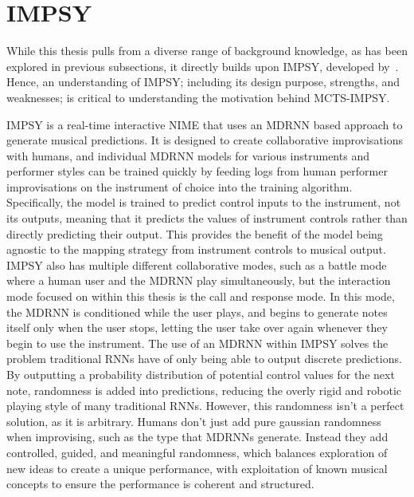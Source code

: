 \section{IMPSY}
While this thesis pulls from a diverse range of background knowledge, as has been explored in previous subsections, it directly builds upon IMPSY, developed by~\cite{Martin2019IMPSY}. Hence, an understanding of IMPSY; including its design purpose, strengths, and weaknesses; is critical to understanding the motivation behind MCTS-IMPSY.

IMPSY is a real-time interactive NIME that uses an MDRNN based approach to generate musical predictions. It is designed to create collaborative improvisations with humans, and individual MDRNN models for various instruments and performer styles can be trained quickly by feeding logs from human performer improvisations on the instrument of choice into the training algorithm. Specifically, the model is trained to predict control inputs to the instrument, not its outputs, meaning that it predicts the values of instrument controls rather than directly predicting their output. This provides the benefit of the model being agnostic to the mapping strategy from instrument controls to musical output. IMPSY also has multiple different collaborative modes, such as a battle mode where a human user and the MDRNN play simultaneously, but the interaction mode focused on within this thesis is the call and response mode. In this mode, the MDRNN is conditioned while the user plays, and begins to generate notes itself only when the user stops, letting the user take over again whenever they begin to use the instrument. The use of an MDRNN within IMPSY solves the problem traditional RNNs have of only being able to output discrete predictions. By outputting a probability distribution of potential control values for the next note, randomness is added into predictions, reducing the overly rigid and robotic playing style of many traditional RNNs. However, this randomness isn't a perfect solution, as it is arbitrary. Humans don't just add pure gaussian randomness when improvising, such as the type that MDRNNs generate. Instead they add controlled, guided, and meaningful randomness, which balances exploration of new ideas to create a unique performance, with exploitation of known musical concepts to ensure the performance is coherent and structured. 

